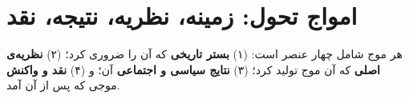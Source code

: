 \section{امواج تحول: زمینه، نظریه، نتیجه، نقد}
\label{sec:waves}

\begin{tcolorbox}[wavebox, title={چارچوب تحلیل امواج}]
هر موج شامل چهار عنصر است: (۱) \textbf{بستر تاریخی} که آن را ضروری کرد؛ (۲) \textbf{نظریه‌ی اصلی} که آن موج تولید کرد؛ (۳) \textbf{نتایج سیاسی و اجتماعی} آن؛ و (۴) \textbf{نقد و واکنش} موجی که پس از آن آمد.
\end{tcolorbox}

\vspace{0.5cm}

